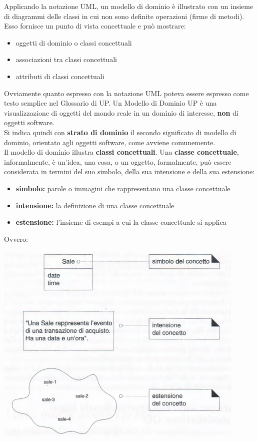 \documentclass[a4paper,12pt, oneside]{book}
\begin{document}
Applicando la notazione UML, un modello di dominio è illustrato con un insieme di diagrammi delle classi in cui non sono definite operazioni (firme di metodi). Esso fornisce un punto di vista concettuale e può mostrare:
\begin{itemize}
	\item oggetti di dominio o classi concettuali
	\item associazioni tra classi concettuali
	\item attributi di classi concettuali
\end{itemize}
Ovviamente quanto espresso con la notazione UML poteva essere espresso come testo semplice nel Glossario di UP. Un Modello di Dominio UP è una visualizzazione di oggetti del mondo reale in un dominio di interesse, \textbf{non} di oggetti software.\\
Si indica quindi con \textbf{strato di dominio} il secondo significato di modello di dominio, orientato agli oggetti software, come avviene comunemente.\\
Il modello di dominio illustra \textbf{classi concettuali}. Una \textbf{classe concettuale}, informalmente, è un'idea, una cosa, o un oggetto, formalmente, può essere considerata in termini del suo simbolo, della sua intensione e della sua estensione: 
\begin{itemize}
	\item \textbf{simbolo:} parole o immagini che rappresentano una classe concettuale
	\item \textbf{intensione:} la definizione di una classe concettuale
	\item \textbf{estensione:} l'insieme di esempi a cui la classe concettuale si applica
\end{itemize}
Ovvero:
\begin{center}
	\includegraphics[scale=0.7]{img/conc.png}
\end{center}
\end{document}
